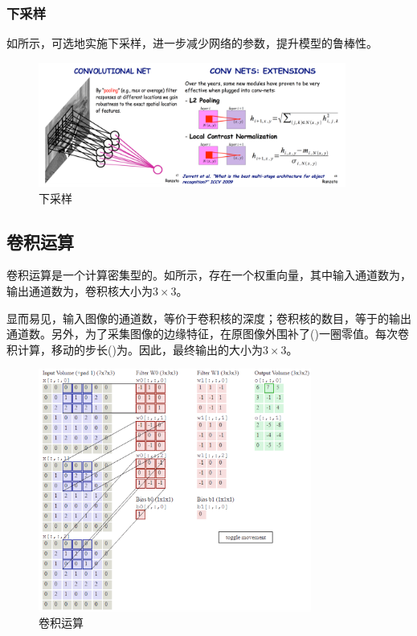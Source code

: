 \begin{content}
\begin{content}
\subsubsection{下采样}

如所示，可选地实施下采样，进一步减少网络的参数，提升模型的鲁棒性。

\begin{figure}[H]
\centering
\includegraphics[width=0.9\textwidth]{figures/mnist-subsample.png}
\caption{下采样}
 \label{fig:mnist-subsample}
\end{figure}

\subsection{卷积运算}

卷积运算是一个计算密集型的。如所示，存在一个权重向量，其中输入通道数为，输出通道数为，卷积核大小为$3 \times 3$。

显而易见，输入图像的通道数，等价于卷积核的深度；卷积核的数目，等于的输出通道数。另外，为了采集图像的边缘特征，在原图像外围补了()一圈零值。每次卷积计算，移动的步长()为。因此，最终输出的大小为$3 \times 3$。

\begin{figure}[H]
\centering
\includegraphics[width=0.8\textwidth]{figures/mnist-conv2d-gif.png}
\caption{卷积运算}
 \label{fig:mnist-conv2d-gif}
\end{figure}


\end{content}
\end{content}
